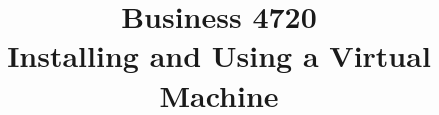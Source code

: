 \documentclass{article}
\title{Business 4720\\ \vspace{\baselineskip}
Installing and Using a Virtual Machine}
\begin{document}
\maketitle

\vfill

\clearpage


\end{document}
